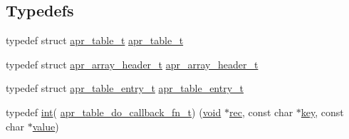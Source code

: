 \subsection*{Typedefs}
\begin{DoxyCompactItemize}
\item 
typedef struct \hyperlink{structapr__table__t}{apr\+\_\+table\+\_\+t} \hyperlink{group__apr__tables_gad7ea82d6608a4a633fc3775694ab71e4}{apr\+\_\+table\+\_\+t}
\item 
typedef struct \hyperlink{structapr__array__header__t}{apr\+\_\+array\+\_\+header\+\_\+t} \hyperlink{group__apr__tables_ga63e76617a1cd3828bbaefcbf93928ec2}{apr\+\_\+array\+\_\+header\+\_\+t}
\item 
typedef struct \hyperlink{structapr__table__entry__t}{apr\+\_\+table\+\_\+entry\+\_\+t} \hyperlink{group__apr__tables_gac7e0151b714e58b75c597dafed75df3f}{apr\+\_\+table\+\_\+entry\+\_\+t}
\item 
typedef \hyperlink{pcre_8txt_a42dfa4ff673c82d8efe7144098fbc198}{int}( \hyperlink{group__apr__tables_gabac50c7b2bae5f8cef6245d1959f8b06}{apr\+\_\+table\+\_\+do\+\_\+callback\+\_\+fn\+\_\+t}) (\hyperlink{group__MOD__ISAPI_gacd6cdbf73df3d9eed42fa493d9b621a6}{void} $\ast$\hyperlink{group__apr__tables_gafcb9c0f7671f566c4804fa8bbad43c4b}{rec}, const char $\ast$\hyperlink{apr__siphash_8h_adac0b6a30345ea1d0daa8a692b0b7ad9}{key}, const char $\ast$\hyperlink{pcretest_8txt_a262ad32c75be9b93a7a77b045ed14fe0}{value})
\end{DoxyCompactItemize}
